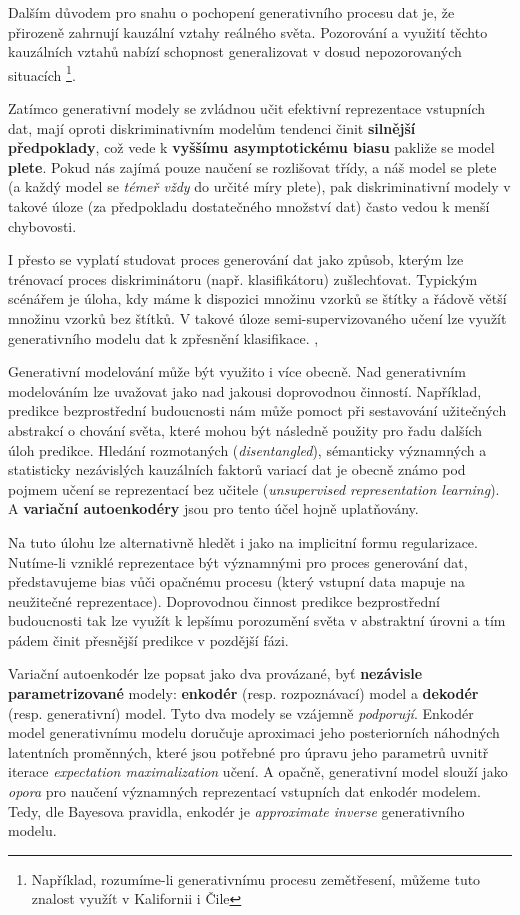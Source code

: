 Dalším důvodem pro snahu o pochopení generativního procesu dat je, že přirozeně zahrnují kauzální vztahy reálného světa.
Pozorování a využití těchto kauzálních vztahů nabízí schopnost generalizovat v dosud nepozorovaných situacích
\footnote{Například, rozumíme-li generativnímu procesu zemětřesení, můžeme tuto znalost využít v Kalifornii i Čile}.

Zatímco generativní modely se zvládnou učit efektivní reprezentace vstupních dat, mají oproti diskriminativním modelům tendenci činit \textbf{silnější předpoklady}, což vede k \textbf{vyššímu asymptotickému biasu} pakliže se model \textbf{plete}. \cite{Banerjee2007}
Pokud nás zajímá pouze naučení se rozlišovat třídy, a náš model se plete (a každý model se \emph{témeř vždy} do určité míry plete), pak diskriminativní modely v takové úloze (za předpokladu dostatečného množství dat) často vedou k menší chybovosti.

I přesto se vyplatí studovat proces generování dat jako způsob, kterým lze trénovací proces diskriminátoru (např. klasifikátoru) zušlechťovat.
Typickým scénářem je úloha, kdy máme k dispozici množinu vzorků se štítky a řádově větší množinu vzorků bez štítků.
V takové úloze semi-supervizovaného učení lze využít generativního modelu dat k zpřesnění klasifikace. \cite{Kingma2014}, \cite{Soenderby2016}

Generativní modelování může být využito i více obecně. Nad generativním modelováním lze uvažovat jako nad jakousi doprovodnou činností.
Například, predikce bezprostřední budoucnosti nám může pomoct při sestavování užitečných abstrakcí o chování světa, které mohou být následně použity pro řadu dalších úloh predikce.
Hledání rozmotaných (\emph{disentangled}), sémanticky významných a statisticky nezávislých kauzálních faktorů variací dat je obecně známo pod pojmem učení se reprezentací bez učitele (\emph{unsupervised representation learning}).
A \textbf{variační autoenkodéry} jsou pro tento účel hojně uplatňovány.

Na tuto úlohu lze alternativně hledět i jako na implicitní formu regularizace. Nutíme-li vzniklé reprezentace být významnými pro proces generování dat, představujeme bias vůči opačnému procesu (který vstupní data mapuje na neužitečné reprezentace).
Doprovodnou činnost predikce bezprostřední budoucnosti tak lze využít k lepšímu porozumění světa v abstraktní úrovni a tím pádem činit přesnější predikce v pozdější fázi.

Variační autoenkodér lze popsat jako dva provázané, byť \textbf{nezávisle parametrizované} modely: \textbf{enkodér} (resp. rozpoznávací) model a \textbf{dekodér} (resp. generativní) model.
Tyto dva modely se vzájemně \emph{podporují}. Enkodér model generativnímu modelu doručuje aproximaci jeho posteriorních náhodných latentních proměnných,
které jsou potřebné pro úpravu jeho parametrů uvnitř iterace \emph{expectation maximalization} učení.
A opačně, generativní model slouží jako \emph{opora} pro naučení významných reprezentací vstupních dat enkodér modelem.
Tedy, dle Bayesova pravidla, enkodér je \emph{approximate inverse} generativního modelu.

